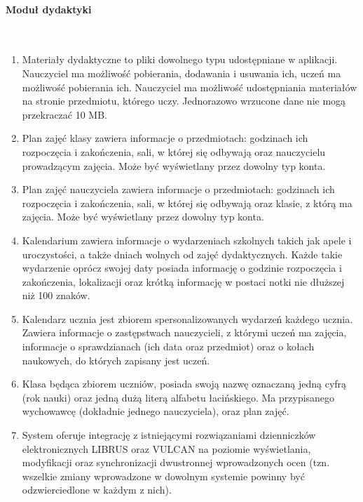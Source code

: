 \documentclass{article}
\begin{document}
\paragraph{Moduł dydaktyki} \mbox{}\\
\begin{enumerate}
	\item Materiały dydaktyczne to pliki dowolnego typu udostępniane w aplikacji. Nauczyciel ma możliwość pobierania, dodawania i usuwania ich, uczeń ma możliwość pobierania ich. Nauczyciel ma możliwość udostępniania materiałów na stronie przedmiotu, którego uczy. Jednorazowo wrzucone dane nie mogą przekraczać 10 MB.
    \item Plan zajęć klasy zawiera informacje o przedmiotach: godzinach ich rozpoczęcia i zakończenia, sali, w której się odbywają oraz nauczycielu prowadzącym zajęcia. Może być wyświetlany przez dowolny typ konta.
    \item Plan zajęć nauczyciela zawiera informacje o przedmiotach: godzinach ich rozpoczęcia i zakończenia, sali, w której się odbywają oraz klasie, z którą ma zajęcia. Może być wyświetlany przez dowolny typ konta.
    \item Kalendarium zawiera informacje o wydarzeniach szkolnych takich jak apele i uroczystości, a także dniach wolnych od zajęć dydaktycznych. Każde takie wydarzenie oprócz swojej daty posiada informację o godzinie rozpoczęcia i zakończenia, lokalizacji oraz krótką informację w postaci notki nie dłuższej niż 100 znaków.
    \item Kalendarz ucznia jest zbiorem spersonalizowanych wydarzeń każdego ucznia. Zawiera informacje o zastępstwach nauczycieli, z którymi uczeń ma zajęcia, informacje o sprawdzianach (ich data oraz przedmiot) oraz o kołach naukowych, do których zapisany jest uczeń.
    \item Klasa będąca zbiorem uczniów, posiada swoją nazwę oznaczaną jedną cyfrą (rok nauki) oraz jedną dużą literą alfabetu łacińskiego. Ma przypisanego wychowawcę (dokładnie jednego nauczyciela), oraz plan zajęć.
    \item System oferuje integrację z istniejącymi rozwiązaniami dzienniczków elektronicznych LIBRUS oraz VULCAN na poziomie wyświetlania, modyfikacji oraz synchronizacji dwustronnej wprowadzonych ocen (tzn. wszelkie zmiany wprowadzone w dowolnym systemie powinny być odzwierciedlone w każdym z nich).
\end{enumerate}
\end{document}
